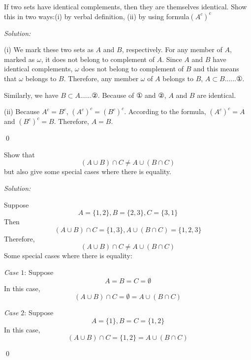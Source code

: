 \documentclass[12pt]{article}
\newenvironment{problem}[2][Problem]{\begin{trivlist}
\item[\hskip \labelsep {\bfseries #1}\hskip \labelsep {\bfseries #2.}]}{\end{trivlist}}
\newenvironment{sol}
    {\emph{Solution:}
    }
    {
    \qed
    }
\begin{document}




\begin{problem}{1} 
If two sets have identical complements, then they are themselves identical.
Show this in two ways:(i) by verbal definition, (ii) by using formula$(A^{c})^{c}$
\end{problem}
\begin{sol}

(i) We mark these two sets as $A$ and $B$, respectively. For any member of $A$, marked as $\omega$, it does not belong to complement of $A$. Since $A$ and $B$ have identical complements, $\omega$ does not belong to complement of $B$ and this means that $\omega$ belongs to $B$. Therefore, any member $\omega$ of $A$ belongs to $B$, $A\subset B$......①.

Similarly, we have $B\subset A$......②. Because of ① and ②, $A$ and $B$ are identical.

(ii) Because $A^c=B^c$, $(A^c)^c=(B^c)^c$. According to the formula, $(A^c)^c=A$ and $(B^c)^c=B$. Therefore, $A=B$.
\end{sol}



\begin{problem}{2}
Show that
$$(A \cup B) \cap C \neq A \cup(B \cap C)$$
but also give some special cases where there is equality.
\end{problem}
\begin{sol}

Suppose
\[
A=\{1,2\}, B=\{2,3\}, C=\{3,1\}
\]
Then
\[
(A \cup B) \cap C=\{1,3\}, A \cup(B \cap C)=\{1,2,3\}
\]
Therefore,
\[
(A \cup B) \cap C \neq A \cup(B \cap C)
\]
Some special cases where there is equality:

\textit{Case $1$}: Suppose
\[
A=B=C=\emptyset
\]
\indent\indent In this case,
\[
(A \cup B) \cap C=\emptyset=A \cup(B \cap C)
\]

\textit{Case $2$}: Suppose
\[
A=\{1\}, B=C=\{1,2\}
\]
\indent\indent In this case,
\[
(A \cup B) \cap C=\{1,2\}=A \cup(B \cap C)
\]
\end{sol}
\end{document}
